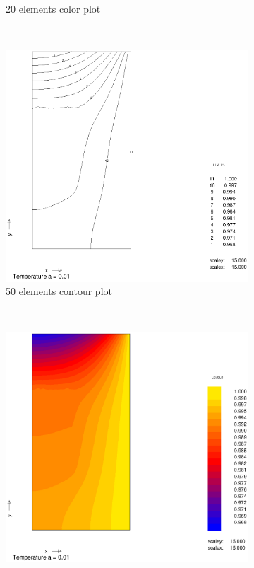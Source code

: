 \documentclass[10pt,a4paper]{article}
\begin{document}
\begin{figure}[h]
\begin{subfigure}[b]{0.45\textwidth}
                \caption{20 elements color plot}
                \label{fig:colplot_a001_20el}
        \end{subfigure}
        ~           
        \begin{subfigure}[b]{0.45\textwidth}
                \includegraphics[width=\textwidth]{cont_a001_50el}
                \caption{50 elements contour plot}
                \label{fig:col_a001_50el}
        \end{subfigure}      
        ~
        \begin{subfigure}[b]{0.45\textwidth}
                \includegraphics[width=\textwidth]{colplot_a001_50el}

\end{subfigure}
\end{figure}
\end{document}
